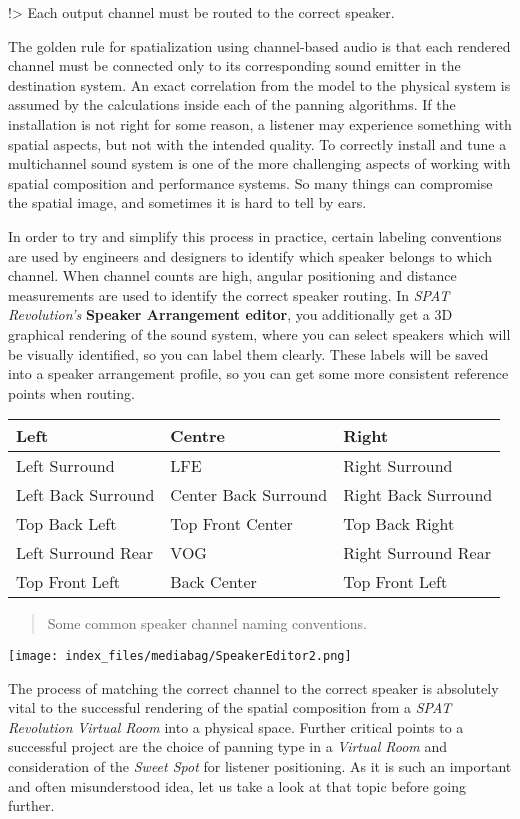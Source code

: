 \documentclass[
  letterpaper,
  DIV=11,
  numbers=noendperiod]{scrreport}
\begin{document}
!\textgreater{} Each output channel must be routed to the correct
speaker.

The golden rule for spatialization using channel-based audio is that
each rendered channel must be connected only to its corresponding sound
emitter in the destination system. An exact correlation from the model
to the physical system is assumed by the calculations inside each of the
panning algorithms. If the installation is not right for some reason, a
listener may experience something with spatial aspects, but not with the
intended quality. To correctly install and tune a multichannel sound
system is one of the more challenging aspects of working with spatial
composition and performance systems. So many things can compromise the
spatial image, and sometimes it is hard to tell by ears.

In order to try and simplify this process in practice, certain labeling
conventions are used by engineers and designers to identify which
speaker belongs to which channel. When channel counts are high, angular
positioning and distance measurements are used to identify the correct
speaker routing. In \emph{SPAT Revolution's} \textbf{Speaker Arrangement
editor}, you additionally get a 3D graphical rendering of the sound
system, where you can select speakers which will be visually identified,
so you can label them clearly. These labels will be saved into a speaker
arrangement profile, so you can get some more consistent reference
points when routing.

\begin{longtable}[]{@{}lll@{}}
\toprule()
Left & Centre & Right \\
\midrule()
\endhead
Left Surround & LFE & Right Surround \\
Left Back Surround & Center Back Surround & Right Back Surround \\
Top Back Left & Top Front Center & Top Back Right \\
Left Surround Rear & VOG & Right Surround Rear \\
Top Front Left & Back Center & Top Front Left \\
\bottomrule()
\end{longtable}

\begin{quote}
Some common speaker channel naming conventions.
\end{quote}

\texttt{[image: index\_files/mediabag/SpeakerEditor2.png]}

The process of matching the correct channel to the correct speaker is
absolutely vital to the successful rendering of the spatial composition
from a \emph{SPAT Revolution} \emph{Virtual Room} into a physical space.
Further critical points to a successful project are the choice of
panning type in a \emph{Virtual Room} and consideration of the
\emph{Sweet Spot} for listener positioning. As it is such an important
and often misunderstood idea, let us take a look at that topic before
going further.
\end{document}
